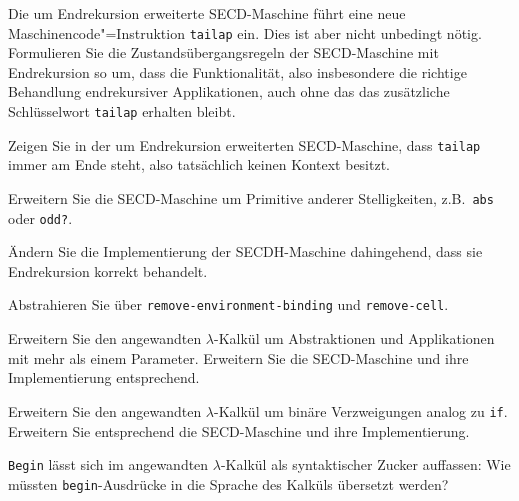 \begin{aufgabe}
  Die um Endrekursion erweiterte SECD-Maschine führt eine neue
  Maschinencode"=Instruktion \texttt{tailap} ein.  Dies ist aber nicht
  unbedingt nötig.  Formulieren Sie die Zustandsübergangsregeln der
  SECD-Maschine mit Endrekursion so um, dass die Funktionalität, also
  insbesondere die richtige Behandlung endrekursiver Applikationen,
  auch ohne das das zusätzliche Schlüsselwort \texttt{tailap}
  erhalten bleibt.
\end{aufgabe}

\begin{aufgabe}
  Zeigen Sie in der um Endrekursion erweiterten
  SECD-Maschine, dass \texttt{tailap} immer am Ende steht, also
  tatsächlich keinen Kontext besitzt.
\end{aufgabe}

\begin{aufgabe}\label{aufgabe:prim-arity}
  Erweitern Sie die SECD-Maschine um Primitive anderer Stelligkeiten,
  z.B.\ \texttt{abs} oder \texttt{odd?}.
\end{aufgabe}

\begin{aufgabe}
  Ändern Sie die Implementierung der SECDH-Maschine dahingehend, dass
  sie Endrekursion korrekt behandelt.
\end{aufgabe}

\begin{aufgabe}
  Abstrahieren Sie über \texttt{remove-environment-binding} und
  \texttt{remove-cell}.
\end{aufgabe}

\begin{aufgabe}
  Erweitern Sie den angewandten $\lambda$-Kalkül um Abstraktionen und
  Applikationen mit mehr als einem Parameter.  Erweitern Sie die
  SECD-Maschine und ihre Implementierung entsprechend.
\end{aufgabe}


\begin{aufgabe}
  Erweitern Sie den angewandten $\lambda$-Kalkül um binäre
  Verzweigungen analog zu \texttt{if}.  Erweitern Sie entsprechend die
  SECD-Maschine und ihre Implementierung.
\end{aufgabe}

\begin{aufgabe}
  \texttt{Begin} lässt sich im angewandten $\lambda$-Kalkül als
  syntaktischer Zucker auffassen: Wie müssten \texttt{begin}-Ausdrücke
  in die Sprache des Kalküls übersetzt werden?
\end{aufgabe}

